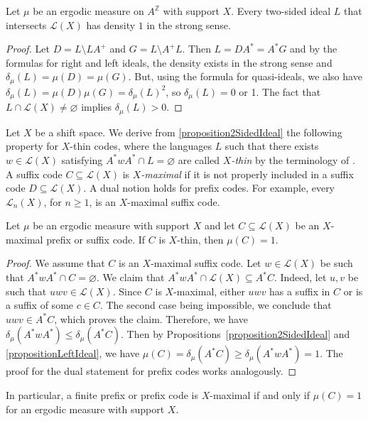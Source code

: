 \documentclass[a4paper,UKenglish,numberwithinsect,cleveref]{lipics-v2021}
\newcommand{\Z}{\mathbb{Z}}
\newcommand{\cL}{\mathcal L}
\begin{document}
\begin{proposition}\label{proposition2SidedIdeal}
    Let $\mu$ be an ergodic measure on $A^\Z$ with support $X$. Every two-sided ideal  $L$ that intersects $\cL(X)$ has density $1$ in the strong sense.
\end{proposition}

\begin{proof}
    Let $D = L\setminus LA^+$ and $G = L\setminus A^+L$. Then $L = DA^* = A^*G$ and by the formulas for right and left ideals, the density exists in the strong sense and $\delta_\mu(L)=\mu(D)=\mu(G)$. But, using the formula for quasi-ideals, we also have $\delta_\mu(L) = \mu(D)\mu(G) = \delta_\mu(L)^2$, so $\delta_\mu(L) = 0$ or 1. The fact that $L\cap \cL(X)\neq\varnothing$ implies $\delta_\mu(L)>0$. 
\end{proof}

Let $X$ be a shift space. We derive from \cref{proposition2SidedIdeal} the following property for $X$-thin codes, where  the languages $L$ such that there exists $w\in \cL(X)$  satisfying $ A^*wA^*\cap L=\varnothing$ are called \emph{$X$-thin} by the  terminology of \cite{BerstelDeFelicePerrinReutenauerRindone2012}.  A suffix code $C\subseteq \cL(X)$ is \emph{$X$-maximal} if it is not properly included in a suffix code $D\subseteq \cL(X)$. A dual notion holds for prefix codes. For example, every $\cL_n(X)$, for $n\ge 1$, is an $X$-maximal suffix code.
\begin{proposition}\label{propositionThinSuff}
    Let $\mu$ be an ergodic measure with support $X$ and let $C\subseteq\cL(X)$ be an $X$-maximal prefix or suffix code. If $C$ is $X$-thin, then $\mu(C)=1$.  
\end{proposition}

\begin{proof}
We assume  that $C$ is an $X$-maximal suffix code.
    Let $w\in\cL(X)$ be such that $A^*wA^*\cap C=\varnothing$. We claim that 
        $A^*wA^*\cap \cL(X)\subseteq A^*C$.
    Indeed, let $u,v$ be such that $uwv\in \cL(X)$. Since $C$ is $X$-maximal, either $uwv$ has a suffix in $C$ or is a suffix of some $c\in C$. The second case being impossible, we conclude that $uwv\in A^*C$, which proves the claim.  Therefore, we have $\delta_\mu(A^*wA^*)\le\delta_\mu(A^*C)$. Then by Propositions~\ref{proposition2SidedIdeal} and \ref{propositionLeftIdeal}, we have $\mu(C) =  \delta_\mu(A^*C)\geq \delta_\mu(A^*wA^*) = 1$.
    The proof for the dual statement for prefix codes works analogously.
\end{proof}
In particular, a finite prefix or prefix code is $X$-maximal if and only if $\mu(C)=1$ for an ergodic measure with support $X$. 
\end{document}
